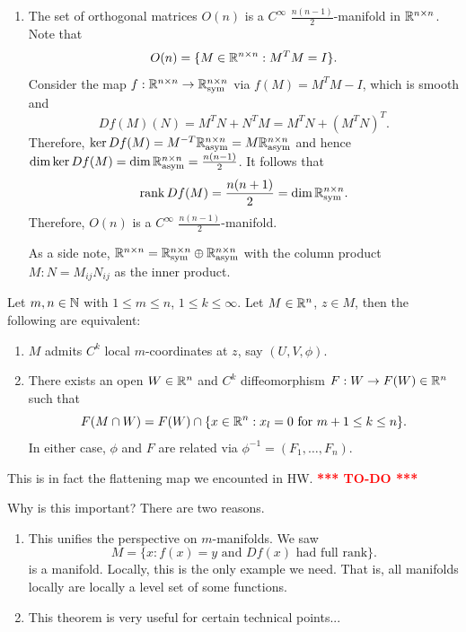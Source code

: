 \documentclass[a4paper]{article}
\newcommand{\TODO}{\textcolor{red}{\textbf{*** TO-DO ***}}}
\begin{document}
\begin{eg}
\begin{enumerate}
\item The set of orthogonal matrices $O(n)$ is a 
$C^\infty$ $\frac{n (n - 1)}{2}$-manifold in $\mathbb{R}^{n \times n}$.
Note that 
\[
O(n) = \{M \in \mathbb{R}^{n \times n} : M^T M = I\}.
\]
Consider the map $f : \mathbb{R}^{n \times n} \to \mathbb{R}^{n \times n}_{\text{sym}}$
via $f(M) = M^T M - I$, which is smooth and 
\[
Df(M)(N) = M^T N + N^T M = M^T N + (M^T N)^T.
\]
Therefore, $\ker Df(M) = M^{-T} \mathbb{R}^{n \times n}_{\text{asym}}
= M \mathbb{R}^{n \times n}_{\text{asym}}$ and hence 
$\dim \ker Df(M) = \dim \mathbb{R}^{n \times n}_{\text{asym}}
= \frac{n (n - 1)}{2}$. It follows that 
\[
\operatorname{rank} Df(M) = \frac{n (n + 1)}{2} = \dim \mathbb{R}^{n \times n}_{\text{sym}}.
\]
Therefore, $O(n)$ is a $C^\infty$ $\frac{n(n-1)}{2}$-manifold.

As a side note, $\mathbb{R}^{n \times n} = \mathbb{R}^{n \times n}_{\text{sym}} 
\oplus \mathbb{R}^{n \times n}_{\text{asym}}$ with the column product 
$M : N = M_{ij} N_{ij}$ as the inner product.
\end{enumerate}
\end{eg}

\begin{thm}
Let $m, n \in \mathbb{N}$ with $1 \leq m \leq n$, $1 \leq k \leq \infty$.
Let $M \in \mathbb{R}^n$, $z \in M$, then the following are equivalent:
\begin{enumerate}
\item $M$ admits $C^k$ local $m$-coordinates at $z$, 
say $(U, V, \phi)$.

\item There exists an open $W \in \mathbb{R}^n$ and $C^k$ diffeomorphism
$F : W \to F(W) \in \mathbb{R}^n$ such that 
\[
F(M \cap W) = F(W) \cap \{x \in \mathbb{R}^n : x_l = 0 \text{ for 
$m + 1 \leq k \leq n$}\}.
\]
In either case, $\phi$ and $F$ are related via 
$\phi^{-1} = (F_1, \dots, F_n)$.
\end{enumerate}
\end{thm}

This is in fact the flattening map we encounted in HW. \TODO

Why is this important? There are two reasons. 
\begin{enumerate}
\item This unifies the perspective on $m$-manifolds. We saw 
\[
M = \{x : \text{$f(x) = y$ and $Df(x)$ had full rank}\}.
\]
is a manifold. Locally, this is the only example we need.
That is, all manifolds locally are locally a level set of 
some functions.

\item This theorem is very useful for certain technical
points...
\end{enumerate}
\end{document}

